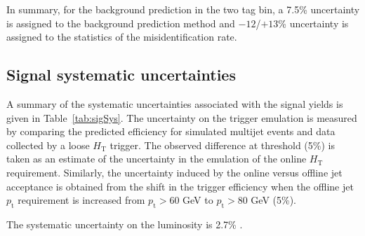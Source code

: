 In summary, for the background prediction in the two tag bin, a 7.5\% uncertainty is assigned to the
background prediction method and ${-}12$/$+13$\% uncertainty is assigned to 
the statistics of the misidentification rate. 

\subsection{Signal systematic uncertainties}
\label{sec:sigsys}
A summary of the systematic uncertainties associated with the signal
yields is given in Table~\ref{tab:sigSys}.  The uncertainty on the
trigger emulation is measured by comparing the predicted efficiency
for simulated multijet events and data collected by a loose
$H_{\textrm{T}}$ trigger. The observed difference at threshold (5\%)
is taken as an estimate of the uncertainty in the emulation of the
online $H_{\textrm{T}}$ requirement.  Similarly, the uncertainty
induced by the online versus offline jet acceptance is obtained from
the shift in the trigger efficiency when the offline jet $p_{\textrm{t}}$
requirement is increased from $p_{\textrm{t}}>60$ GeV to $p_{\textrm{t}}>80$ GeV (5\%).

The systematic uncertainty on the luminosity is 2.7\% \cite{LUMI}.


